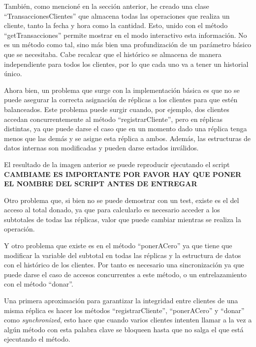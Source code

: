 \documentclass{article}
\begin{document}
También, como mencioné en la sección anterior, he creado una clase ``TransaccionesClientes'' que almacena todas las operaciones que realiza un cliente, tanto la fecha y hora como la cantidad. Esto, unido con el método ``getTransacciones'' permite mostrar en el modo interactivo esta información. No es un método como tal, sino más bien una profundización de un parámetro básico que se necesitaba. Cabe recalcar que el histórico se almacena de manera independiente para todos los clientes, por lo que cada uno va a tener un historial único.





Ahora bien, un problema que surge con la implementación básica es que no se puede asegurar la correcta asignación de réplicas a los clientes para que estén balanceados. Este problema puede surgir cuando, por ejemplo, dos clientes accedan concurrentemente al método ``registrarCliente'', pero en réplicas distintas, ya que puede darse el caso que en un momento dado una réplica tenga menos que las demás y se asigne esta réplica a ambos. Además, las estructuras de datos internas son modificadas y pueden darse estados inválidos.


El resultado de la imagen anterior se puede reproducir ejecutando el script \textbf{CAMBIAME ES IMPORTANTE POR FAVOR HAY QUE PONER EL NOMBRE DEL SCRIPT ANTES DE ENTREGAR}

Otro problema que, si bien no se puede demostrar con un test, existe es el del acceso al total donado, ya que para calcularlo es necesario acceder a los subtotales de todas las réplicas, valor que puede cambiar mientras se realiza la operación.

Y otro problema que existe es en el método ``ponerACero'' ya que tiene que modificar la variable del subtotal en todas las réplicas y la estructura de datos con el histórico de los clientes. Por tanto es necesario una sincronización ya que puede darse el caso de accesos concurrentes a este método, o un entrelazamiento con el método ``donar''.

Una primera aproximación para garantizar la integridad entre clientes de una misma réplica es hacer los métodos ``registrarCliente'', ``ponerACero'' y ``donar'' como \textit{synchronized}, esto hace que cuando varios clientes intenten llamar a la vez a algún método con esta palabra clave se bloqueen hasta que no salga el que está ejecutando el método.
\end{document}
